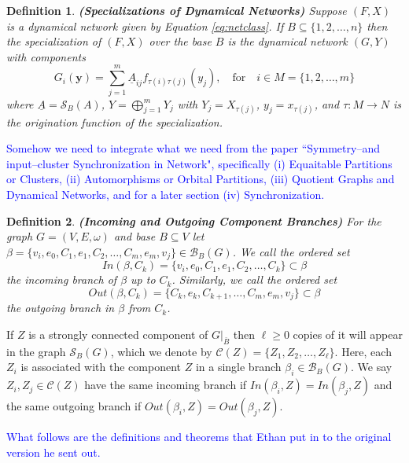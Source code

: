 \documentclass[10pt]{elsarticle}
\newtheorem{definition}{Definition}
\theoremstyle{remark}
\begin{document}
\begin{definition}\label{def:specdyn}\textbf{(Specializations of Dynamical Networks)}
Suppose $(F,X)$ is a dynamical network given by Equation \eqref{eq:netclass}. If $B\subseteq \{1,2,\dots,n\}$ then the \emph{specialization} of $(F,X)$ over the base $B$ is the dynamical network $(G,Y)$ with components
\[
G_i(\mathbf{y})=\sum_{j=1}^m \underline{A}_{ij}f_{\tau(i)\tau(j)}(y_j), \quad \text{for} \quad i\in M=\{1,2,\dots,m\}
\]
where $\underline{A}=\mathcal{S}_B(A)$, $Y=\bigoplus_{j=1}^m Y_j$ with $Y_j=X_{\tau(j)}$, $y_j=x_{\tau(j)}$, and $\tau:M\rightarrow N$ is the origination function of the specialization.
\end{definition}

\begin{center}
    \textcolor{blue}{Somehow we need to integrate what we need from the paper ``Symmetry--and input--cluster Synchronization in Network", specifically (i) Equaitable Partitions or Clusters, (ii) Automorphisms or Orbital Partitions, (iii) Quotient Graphs and Dynamical Networks, and for a later section (iv) Synchronization.}
\end{center}

\begin{definition}\label{def:inout}\textbf{(Incoming and Outgoing Component Branches)}
For the graph $G=(V,E,\omega)$ and base $B\subseteq V$ let $\beta=\{v_i,e_{0},C_1,e_{1},C_2,\dots,C_m,e_{m},v_{j}\}\in\mathcal{B}_B(G)$. We call the ordered set
\[
In(\beta,C_k)=\{v_i,e_{0},C_1,e_{1},C_2,\dots,C_k\}\subset \beta
\]
the \emph{incoming branch} of $\beta$ up to $C_k$. Similarly, we call the ordered set
\[
Out(\beta,C_k)=\{C_k,e_{k},C_{k+1},\dots,C_m,e_{m},v_{j}\}\subset \beta
\]
the \emph{outgoing branch} in $\beta$ from $C_k$.
\end{definition}

If $Z$ is a strongly connected component of $G|_{\bar{B}}$ then $\ell\geq 0$ copies of it will appear in the graph $\mathcal{S}_B(G)$, which we denote by $\mathcal{C}(Z)=\{Z_1,Z_2,\dots,Z_{\ell}\}$. Here, each $Z_i$ is associated with the component $Z$ in a single branch $\beta_i\in\mathcal{B}_B(G)$. We say $Z_i,Z_j\in\mathcal{C}(Z)$ have the same incoming branch if $In(\beta_i,Z)=In(\beta_j,Z)$ and the same outgoing branch if $Out(\beta_i,Z)=Out(\beta_j,Z)$.

\begin{center}
    \textcolor{blue}{What follows are the definitions and theorems that Ethan put in to the original version he sent out.}
\end{center}
\end{document}
